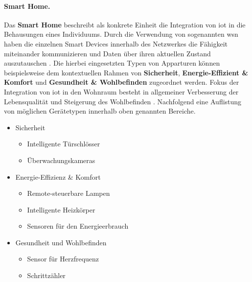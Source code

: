 \paragraph{Smart Home.}
\label{sec:Grundlagen:para:Smart Home}
Das \textbf{Smart Home} beschreibt als konkrete Einheit die Integration von \ac{iot} in die Behausungen eines Individuums. Durch die Verwendung von sogenannten \acl{wsn} haben die einzelnen Smart Devices innerhalb des Netzwerkes die Fähigkeit miteinander kommunizieren und Daten über ihren aktuellen Zustand auszutauschen \cite{Biljana2017}. Die hierbei eingesetzten Typen von Apparturen können beispielsweise dem kontextuellen Rahmen von \textbf{Sicherheit}, \textbf{Energie-Effizient \& Komfort} und \textbf{Gesundheit \& Wohlbefinden} zugeordnet werden. Fokus der Integration von \ac{iot} in den Wohnraum besteht in allgemeiner Verbesserung der Lebensqualität und Steigerung des Wohlbefinden \cite{Bastos2018}. Nachfolgend eine Auflistung von möglichen Gerätetypen innerhalb oben genannten Bereiche.

\begin{itemize}
	\item Sicherheit
		\begin{itemize}
			\item Intelligente Türschlösser
			\item Überwachungskameras
		\end{itemize}
	\item Energie-Effizienz \& Komfort
		\begin{itemize}
			\item Remote-steuerbare Lampen
			\item Intelligente Heizkörper
			\item Sensoren für den Energieerbrauch
		\end{itemize}
	\item Gesundheit und Wohlbefinden
		\begin{itemize}
			\item Sensor für Herzfrequenz
			\item Schrittzähler
		\end{itemize}
\end{itemize}


